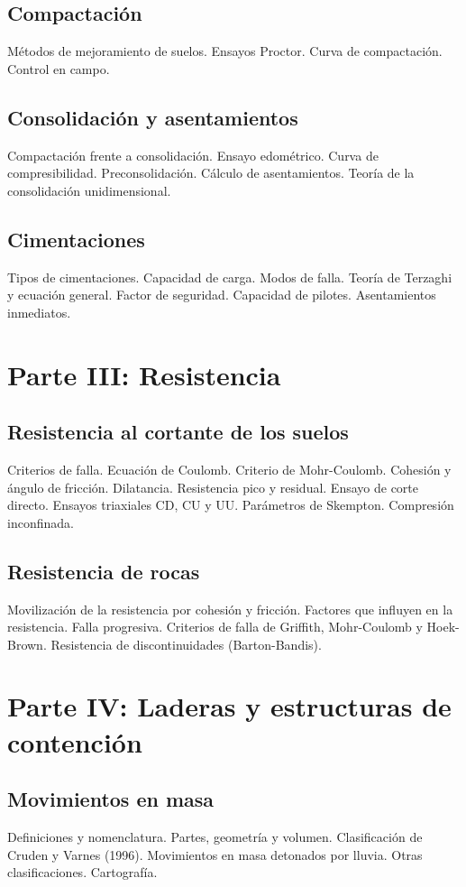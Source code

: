 \documentclass[a4paper,twoside,11pt]{article}
\begin{document}
\subsection{Compactación}
Métodos de mejoramiento de suelos. Ensayos Proctor. Curva de compactación. Control en campo.

\subsection{Consolidación y asentamientos}
Compactación frente a consolidación. Ensayo edométrico. Curva de compresibilidad. Preconsolidación.
Cálculo de asentamientos. Teoría de la consolidación unidimensional.

\subsection{Cimentaciones}
Tipos de cimentaciones. Capacidad de carga. Modos de falla. Teoría de Terzaghi y ecuación general.
Factor de seguridad. Capacidad de pilotes. Asentamientos inmediatos.

\section*{Parte III: Resistencia}

\subsection{Resistencia al cortante de los suelos}
Criterios de falla. Ecuación de Coulomb. Criterio de Mohr-Coulomb. Cohesión y ángulo de fricción.
Dilatancia. Resistencia pico y residual. Ensayo de corte directo. Ensayos triaxiales CD, CU y UU.
Parámetros de Skempton. Compresión inconfinada.

\subsection{Resistencia de rocas}
Movilización de la resistencia por cohesión y fricción. Factores que influyen en la resistencia.
Falla progresiva. Criterios de falla de Griffith, Mohr-Coulomb y Hoek-Brown. Resistencia de
discontinuidades (Barton-Bandis).

\section*{Parte IV: Laderas y estructuras de contención}

\subsection{Movimientos en masa}
Definiciones y nomenclatura. Partes, geometría y volumen. Clasificación de Cruden y Varnes (1996).
Movimientos en masa detonados por lluvia. Otras clasificaciones. Cartografía.
\end{document}
